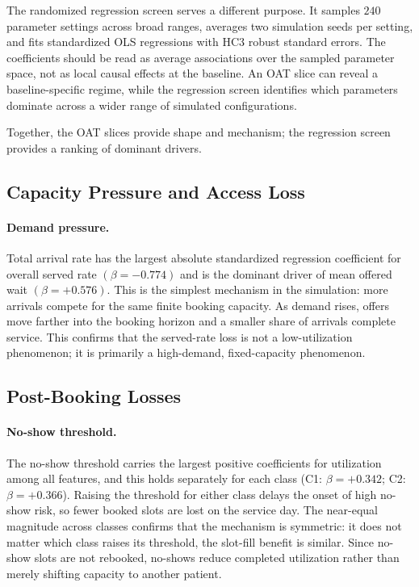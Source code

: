 \documentclass[11pt]{article}
\begin{document}
The randomized regression screen serves a different purpose. It samples
\(240\) parameter settings across broad ranges, averages two simulation seeds
per setting, and fits standardized OLS regressions with HC3 robust standard
errors. The coefficients should be read as average associations over the
sampled parameter space, not as local causal effects at the baseline. An OAT slice can reveal a baseline-specific regime, while
the regression screen identifies which parameters dominate across a wider
range of simulated configurations.

Together, the OAT slices provide shape and mechanism; the regression screen
provides a ranking of dominant drivers.

\subsection{Capacity Pressure and Access Loss}

\paragraph{Demand pressure.}
Total arrival rate has the largest absolute standardized regression
coefficient for overall served rate \((\beta=-0.774)\) and is the dominant
driver of mean offered wait \((\beta=+0.576)\). This is the simplest
mechanism in the simulation: more arrivals compete for the same finite booking
capacity. As demand rises, offers move farther into the booking horizon and a
smaller share of arrivals complete service. This confirms that the served-rate
loss is not a low-utilization phenomenon; it is primarily a high-demand,
fixed-capacity phenomenon.

\subsection{Post-Booking Losses}

\paragraph{No-show threshold.}
The no-show threshold carries the largest positive coefficients for utilization
among all features, and this holds separately for each class
(C1: \(\beta=+0.342\); C2: \(\beta=+0.366\)). Raising the threshold for
either class delays the onset of high no-show risk, so fewer booked slots are
lost on the service day. The near-equal magnitude across classes confirms that
the mechanism is symmetric: it does not matter which class raises its threshold,
the slot-fill benefit is similar. Since no-show slots are not rebooked, no-shows
reduce completed utilization rather than merely shifting capacity to another
patient.
\end{document}

